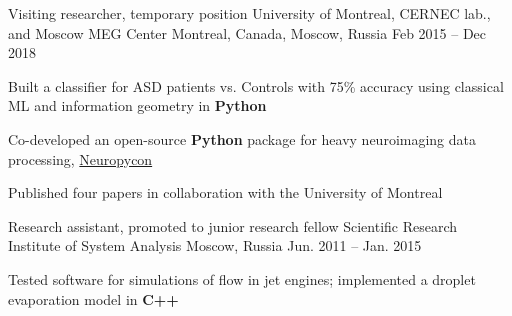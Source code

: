 \begin{cventries}
  \cventry
    {Visiting researcher, temporary position}
    {University of Montreal, CERNEC lab., and Moscow MEG Center}
    {Montreal, Canada, Moscow, Russia}
    {Feb 2015 -- Dec 2018}
    {
      \begin{cvitems}
          \item{Built a classifier for ASD patients vs. Controls with 75\% accuracy using classical ML and information geometry in \textbf{Python}}
          \item{Co-developed an open-source \textbf{Python} package for heavy neuroimaging data processing, \href{https://github.com/neuropycon}{Neuropycon}}
          \item{Published four papers in collaboration with the University of Montreal}
      \end{cvitems}
    }
  \cventry
    {Research assistant, promoted to junior research fellow}
    {Scientific Research Institute of System Analysis}
    {Moscow, Russia}
    {Jun. 2011 -- Jan. 2015}
    {
      \begin{cvitems}
        \item{Tested software for simulations of flow in jet engines; implemented a droplet evaporation model in \textbf{C++}}
      \end{cvitems}
    }
\end{cventries}
